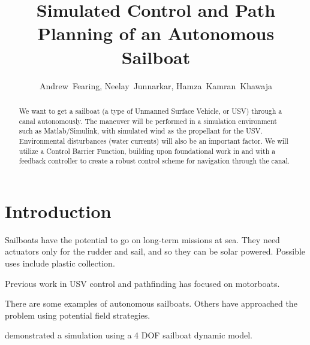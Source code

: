 \documentclass[conference]{IEEEtran}
\begin{document}
\title{Simulated Control and Path Planning of an Autonomous Sailboat}
\author{Andrew~Fearing, Neelay~Junnarkar,  Hamza~Kamran~Khawaja}
\maketitle


\begin{abstract}
We want to get a sailboat (a type of Unmanned Surface Vehicle, or USV) through a canal autonomously. The maneuver will be performed in a simulation environment such as Matlab/Simulink, with simulated wind as the propellant for the USV. Environmental disturbances (water currents) will also be an important factor. We will utilize a Control Barrier Function, building upon foundational work in \cite{Ames2017} and \cite{Ames2019} with a feedback controller to create a robust control scheme for navigation through the canal.

\end{abstract}


\section{Introduction}
Sailboats have the potential to go on long-term missions at sea. They need actuators only for the rudder and sail, and so they can be solar powered. Possible uses include plastic collection.

Previous work in USV control and pathfinding has focused on motorboats. 

There are some examples of autonomous sailboats. Others have approached the problem using potential field strategies.

\cite{Xiao2014} demonstrated a simulation using a 4 DOF sailboat dynamic model.
\end{document}
